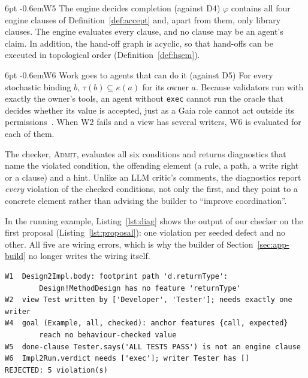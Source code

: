 \documentclass[pdflatex,sn-mathphys-num]{sn-jnl}
\makeatletter
\theoremstyle{thmstyleone}%
\theoremstyle{thmstyletwo}%
\theoremstyle{thmstylethree}%
\newcommand{\W}[1]{\textsf{W#1}}
\newcommand{\D}[1]{\textsf{D#1}}
\newcommand{\code}[1]{\texttt{#1}}
\renewcommand\paragraph{\@startsection{paragraph}{4}{\z@}%
  {6pt \@plus 2pt \@minus 1pt}{-0.6em}{\normalfont\normalsize\bfseries}}
\makeatother
\begin{document}
\paragraph{\W{5} The engine decides completion (against \D{4})} $\varphi$
contains all four engine clauses of Definition~\ref{def:accept} and, apart from
them, only library clauses. The engine evaluates every clause, and no clause
may be an agent's claim. In addition, the hand-off graph is acyclic, so
that hand-offs can be executed in topological order
(Definition~\ref{def:hsem}).

\paragraph{\W{6} Work goes to agents that can do it (against \D{5})} For every
stochastic binding $b$, $\tau(b)\subseteq\kappa(a)$ for its owner $a$. Because
validators run with exactly the owner's tools, an agent without \code{exec}
cannot run the oracle that decides whether its value is accepted, just as a
Gaia role cannot act outside its permissions~\cite{wooldridge2000gaia}. When
\W{2} fails and a view has several writers, \W{6} is evaluated for each of
them.


The checker, \textsc{Admit}, evaluates all six conditions and returns
diagnostics that name the violated condition, the offending element (a rule, a
path, a write right or a clause) and a hint. Unlike
an LLM critic's comments, the diagnostics report \emph{every} violation of the
checked conditions, not only the first, and they point to a concrete element
rather than advising the builder to ``improve coordination''.

In the running example, Listing~\ref{lst:diag} shows the output of our checker
on the first proposal (Listing~\ref{lst:proposal}): one violation per seeded
defect and no other. All five are wiring errors, which is why the builder of
Section~\ref{sec:app-build} no longer writes the wiring itself.

\begin{lstlisting}[float=tb, style=engine, caption={Checker output on Listing~\ref{lst:proposal}.}, label={lst:diag}]
W1  Design2Impl.body: footprint path 'd.returnType':
        Design!MethodDesign has no feature 'returnType'
W2  view Test written by ['Developer', 'Tester']; needs exactly one writer
W4  goal (Example, all, checked): anchor features {call, expected}
        reach no behaviour-checked value
W5  done-clause Tester.says('ALL TESTS PASS') is not an engine clause
W6  Impl2Run.verdict needs ['exec']; writer Tester has []
REJECTED: 5 violation(s)
\end{lstlisting}
\end{document}
